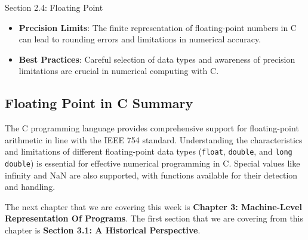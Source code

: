 \begin{notes}{Section 2.4: Floating Point}
    \begin{itemize}
        \item \textbf{Precision Limits}: The finite representation of floating-point numbers in C can lead to rounding errors and limitations in numerical accuracy.
        \item \textbf{Best Practices}: Careful selection of data types and awareness of precision limitations are crucial in numerical computing with C.
    \end{itemize}
    
    \subsection*{Floating Point in C Summary}
    
    The C programming language provides comprehensive support for floating-point arithmetic in line with the IEEE 754 standard. Understanding the characteristics and limitations of different 
    floating-point data types (\texttt{float}, \texttt{double}, and \texttt{long double}) is essential for effective numerical programming in C. Special values like infinity and NaN are also supported, 
    with functions available for their detection and handling.
\end{notes}

The next chapter that we are covering this week is \textbf{Chapter 3: Machine-Level Representation Of Programs}. The first section that we are covering from this chapter is \textbf{Section 3.1: A Historical Perspective}.

